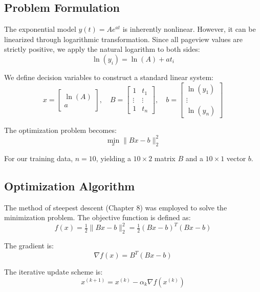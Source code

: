 \documentclass[11pt]{article}
\begin{document}
\subsection{Problem Formulation}

The exponential model $y(t)=A e^{a t}$ is inherently nonlinear. However, it can be linearized through logarithmic transformation. Since all pageview values are strictly positive, we apply the natural logarithm to both sides:
\begin{equation}
\ln(y_i)=\ln(A)+a t_i
\end{equation}

We define decision variables to construct a standard linear system:
\begin{equation}
x=\begin{bmatrix}\ln(A)\\ a\end{bmatrix},\quad
B=\begin{bmatrix}1&t_1\\ \vdots&\vdots\\ 1&t_n\end{bmatrix},\quad
b=\begin{bmatrix}\ln(y_1)\\ \vdots\\ \ln(y_n)\end{bmatrix}
\end{equation}

The optimization problem becomes:
\begin{equation}
\min_x \|Bx-b\|_2^2
\end{equation}

For our training data, $n=10$, yielding a $10 \times 2$ matrix $B$ and a $10 \times 1$ vector $b$.

\subsection{Optimization Algorithm}

The method of steepest descent (Chapter 8) was employed to solve the minimization problem. The objective function is defined as:
\begin{equation}
f(x)=\tfrac12\|Bx-b\|_2^2 = \tfrac12(Bx-b)^T(Bx-b)
\end{equation}

The gradient is:
\begin{equation}
\nabla f(x)=B^T(Bx-b)
\end{equation}

The iterative update scheme is:
\begin{equation}
x^{(k+1)}=x^{(k)}-\alpha_k \nabla f(x^{(k)})
\end{equation}
\end{document}
